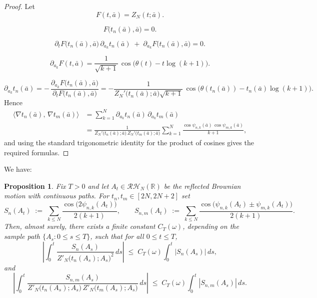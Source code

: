 \documentclass[12pt,reqno]{amsart}
\theoremstyle{plain}
\newtheorem{prop}{Proposition}[section]
\theoremstyle{definition}
\theoremstyle{remark}
\begin{document}
\begin{proof}
Let
\begin{equation}
F(t,\bar a)=Z_N(t;\bar a).
\end{equation}

\begin{equation}
F\bigl(t_n(\bar a),\bar a\bigr)=0 .
\end{equation}

\begin{equation}
\partial_t F\bigl(t_n(\bar a),\bar a\bigr)\,
\partial_{a_k} t_n(\bar a)
\;+\;
\partial_{a_k} F\bigl(t_n(\bar a),\bar a\bigr)
=0 .
\end{equation}

\begin{equation}
\partial_{a_k} F(t,\bar a)
= \frac{1}{\sqrt{k+1}}\,
  \cos\!\bigl(\theta(t)-t\log(k+1)\bigr).
\end{equation}

\begin{equation}
\label{eq:first-der}
\partial_{a_k} t_n(\bar a)
= -\,\frac{\partial_{a_k} F\bigl(t_n(\bar a),\bar a\bigr)}
            {\partial_t F\bigl(t_n(\bar a),\bar a\bigr)}
= -\frac{1}{Z_N'\!\bigl(t_n(\bar a);\bar a\bigr)\sqrt{k+1}}\,
  \cos\!\bigl(\theta(t_n(\bar a)) - t_n(\bar a)\log(k+1)\bigr).
\end{equation}
Hence
\begin{align}
\big\langle \nabla t_n(\bar a),\,\nabla t_m(\bar a)\big\rangle
&= \sum_{k=1}^N
   \partial_{a_k} t_n(\bar a)\,\partial_{a_k} t_m(\bar a) \\
&= \frac{1}{Z_N'\!\bigl(t_n(\bar a);\bar a\bigr)\,Z_N'\!\bigl(t_m(\bar a);\bar a\bigr)}
   \sum_{k=1}^N \frac{\cos\psi_{n,k}(\bar a)\,\cos\psi_{m,k}(\bar a)}{\,k+1\,},
\end{align}
and using the standard trigonometric identity for the product of cosines gives the required formulas. 
\end{proof} 

We have:

\begin{prop}
\label{prop:pull-out}
Fix $T>0$ and let $A_t\in \mathcal{RH}_N(\mathbb R)$ be the reflected Brownian motion
with continuous paths.  For $t_n,t_m \in [2N,2N+2]$ set
\begin{equation}
S_n(A_t)\;:=\;\sum_{k\le N}\frac{\cos \bigl(2\psi_{n,k}(A_t)\bigr)}{2(k+1)},
\qquad
S_{n,m}(A_t)\;:=\;\sum_{k\le N}\frac{\cos \bigl(\psi_{n,k}(A_t)\pm\psi_{m,k}(A_t)\bigr)}{2(k+1)}.
\end{equation}
Then, almost surely, there exists a finite constant $C_T(\omega)$, depending on the
sample path $\{A_s:0\le s\le T\}$, such that for all $0\le t\le T$,
\begin{equation}\label{eq:pull1}
\left|\int_0^t \frac{S_n(A_s)}{Z'_N\!\bigl(t_n(A_s);A_s\bigr)^2}\,ds\right|
\;\le\; C_T(\omega)\int_0^t |S_n(A_s)|\,ds,
\end{equation}
and
\begin{equation}\label{eq:pull2}
\left|\int_0^t \frac{S_{n,m}(A_s)}
{Z'_N\!\bigl(t_n(A_s);A_s\bigr)\,Z'_N\!\bigl(t_m(A_s);A_s\bigr)}\,ds\right|
\;\le\; C_T(\omega)\int_0^t |S_{n,m}(A_s)|\,ds .
\end{equation}
\end{prop}
\end{document}
